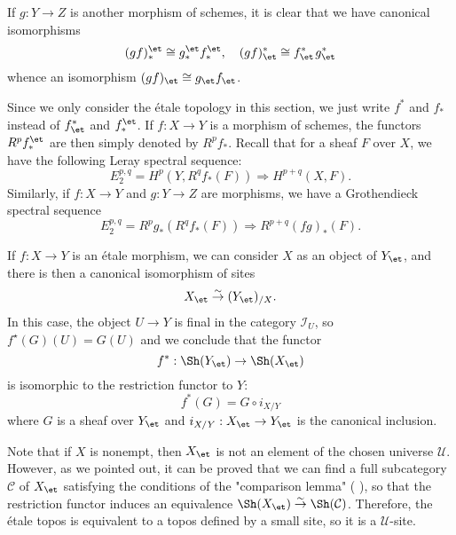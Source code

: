 If $g:Y\to Z$ is another morphism of schemes, it is clear that we have canonical isomorphisms
\begin{equation}\label{scheme etale site inverse direct image functor transitive-1}
(gf)_*^\et\cong g_*^\et f_*^\et,\quad (gf)^*_\et\cong f_\et^*\hspace{1pt} g^*_\et
\end{equation}
whence an isomorphism $(gf)_\et\cong g_\et f_\et$.

Since we only consider the \'etale topology in this section, we just write $f^*$ and $f_*$ instead of $f^*_\et$ and $f_*^\et$. If $f:X\to Y$ is a morphism of schemes, the functors $R^pf_*^\et$ are then simply denoted by $R^pf_*$. Recall that for a sheaf $F$ over $X$, we have the following Leray spectral sequence:
\[E_2^{p,q}=H^p(Y,R^qf_*(F))\Rightarrow H^{p+q}(X,F).\]
Similarly, if $f:X\to Y$ and $g:Y\to Z$ are morphisms, we have a Grothendieck spectral sequence
\[E_2^{p,q}=R^pg_*(R^qf_*(F))\Rightarrow R^{p+q}(fg)_*(F).\]

If $f:X\to Y$ is an \'etale morphism, we can consider $X$ as an object of $Y_\et$, and there is then a canonical isomorphism of sites
\[X_\et\stackrel{\sim}{\to}(Y_\et)_{/X}.\]
In this case, the object $U\to Y$ is final in the category $\mathcal{I}_U$, so $f^\star(G)(U)=G(U)$ and we conclude that the functor
\[f^*:\Sh(Y_\et)\to\Sh(X_\et)\]
is isomorphic to the restriction functor to $Y$:
\begin{equation}\label{scheme etale morphism induced on topos-4}
f^*(G)=G\circ i_{X/Y}
\end{equation}
where $G$ is a sheaf over $Y_\et$ and $i_{X/Y}:X_\et\to Y_\et$ is the canonical inclusion.

\begin{remark}
Note that if $X$ is nonempt, then $X_\et$ is not an element of the chosen universe $\mathscr{U}$. However, as we pointed out, it can be proved that we can find a full subcategory $\mathcal{C}$ of $X_\et$ satisfying the conditions of the "comparison lemma" (\cite{SGA4-1} ), so that the restriction functor induces an equivalence $\Sh(X_\et)\stackrel{\sim}{\to}\Sh(\mathcal{C})$. Therefore, the \'etale topos is equivalent to a topos defined by a small site, so it is a $\mathscr{U}$-site.
\end{remark}

